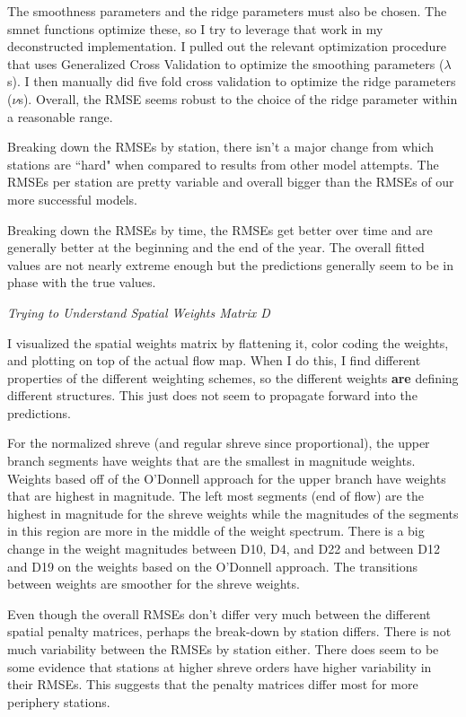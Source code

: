 \documentclass[12pt]{amsart}
\begin{document}
The smoothness parameters and the ridge parameters must also be chosen. The smnet functions optimize these, so I try to leverage that work in my deconstructed implementation. I pulled out the relevant optimization procedure that uses Generalized Cross Validation to optimize the smoothing parameters ($\lambda$s). I then manually did five fold cross validation to optimize the ridge parameters ($\nu$s). Overall, the RMSE seems robust to the choice of the ridge parameter within a reasonable range. 

Breaking down the RMSEs by station, there isn't a major change from which stations are ``hard" when compared to results from other model attempts. The RMSEs per station are pretty variable and overall bigger than the RMSEs of our more successful models. 

Breaking down the RMSEs by time, the RMSEs get better over time and are generally better at the beginning and the end of the year. The overall fitted values are not nearly extreme enough but the predictions generally seem to be in phase with the true values.

\textit{Trying to Understand Spatial Weights Matrix D}

I visualized the spatial weights matrix by flattening it, color coding the weights, and plotting on top of the actual flow map. When I do this, I find different properties of the different weighting schemes, so the different weights \textbf{are} defining different structures. This just does not seem to propagate forward into the predictions.


For the normalized shreve (and regular shreve since proportional), the upper branch segments have weights that are the smallest in magnitude weights. Weights based off of the O'Donnell approach for the upper branch have weights that are highest in magnitude.  The left most segments (end of flow) are the highest in magnitude for the shreve weights while the magnitudes of the segments in this region are more in the middle of the weight spectrum. There is a big change in the weight magnitudes between D10, D4, and D22 and between D12 and D19 on the weights based on the O'Donnell approach. The transitions between weights are smoother for the shreve weights.

Even though the overall RMSEs don't differ very much between the different spatial penalty matrices, perhaps the break-down by station differs. There is not much variability between the RMSEs by station either. There does seem to be some evidence that stations at higher shreve orders have higher variability in their RMSEs. This suggests that the penalty matrices differ most for more periphery stations.
\end{document}
